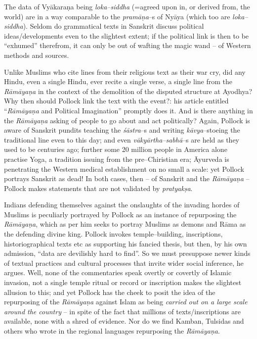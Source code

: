 {The data of Vyākaraṇa being \textit{loka–siddha} (=agreed upon in, or derived from, the world) are in a way comparable to the \textit{pramāṇa}–s of Nyāya (which too are \textit{loka–siddha}). Seldom do grammatical texts in Sanskrit discuss political ideas/developments even to the slightest extent; if the political link is then to be “exhumed” therefrom, it can only be out of wafting the magic wand – of Western methods and sources.

Unlike Muslims who cite lines from their religious text as their war cry, did any Hindu, even a single Hindu, ever recite a single verse, a single line from the \textit{Rāmāyaṇa} in the context of the demolition of the disputed structure at Ayodhya? Why then should Pollock link the text with the event?: his article entitled “\textit{Rāmāyaṇa} and Political Imagination” promptly does it. And is there anything in the \textit{Rāmāyaṇa} asking of people to go about and act politically? Again, Pollock is aware of Sanskrit pundits teaching the \textit{śāstra}–s and writing \textit{kāvya}–s\break toeing the traditional line even to this day; and even \textit{vākyārtha–sabhā}–s are held as they used to be centuries ago; further some 20 million people in America alone practise Yoga, a tradition issuing from the pre–Chiristian era; Āyurveda is penetrating the Western medical establishment on no small a scale: yet Pollock portrays Sanskrit as dead! In both cases, then – of Sanskrit and the \textit{Rāmāyaṇa} – Pollock makes statements that are not validated by \textit{pratyakṣa}.

Indians defending themselves against the onslaughts of the invading hordes of Muslims is peculiarly portrayed by Pollock as an instance of repurposing the \textit{Rāmāyaṇa}, which as per him seeks to portray Muslims as demons and Rāma as the defending divine king. Pollock invokes temple–building, inscriptions, historiographical texts etc as supporting his fancied thesis, but then, by his own admission, “data are devilishly hard to find”. So we must presuppose newer kinds of textual practices and cultural processes that invite wider social inference, he argues. Well, none of the commentaries speak overtly or covertly of Islamic invasion, not a single temple ritual or record or inscription makes the slightest allusion to this; and yet Pollock has the cheek to posit the idea of the repurposing of the \textit{Rāmāyaṇa} against Islam as being \textit{carried out on a large scale around the country} – in spite of the fact that millions of texts/inscriptions are available, none with a shred of evidence. Nor do we find Kamban, Tulsidas and others who wrote in the regional languages repurposing the \textit{Rāmāyaṇa}.

}
